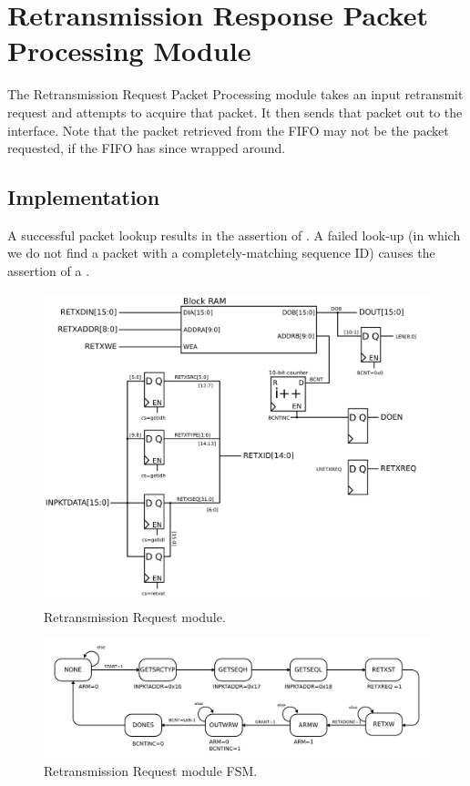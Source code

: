 \section{Retransmission Response Packet Processing Module} 

The Retransmission Request Packet Processing module takes an input
retransmit request and attempts to acquire that packet. It then sends
that packet out to the interface. Note that the packet retrieved from
the FIFO may not be the packet requested, if the FIFO has since
wrapped around.

\subsection{Implementation}

A successful packet lookup results in the assertion of
. A failed look-up (in which we do not find a
packet with a completely-matching sequence ID) causes the assertion of
a .


\begin{figure}
\begin{centering}
\includegraphics[scale=0.8]{retxresponse.svg}
\end{centering}
\caption{Retransmission Request module.}
\label{retxresponse}
\end{figure}

\begin{figure}
\begin{centering}
\includegraphics[scale=0.8]{retxresponse.fsm.svg}
\end{centering}
\caption{Retransmission Request module FSM.}
\label{retxresponse.fsm}
\end{figure}

